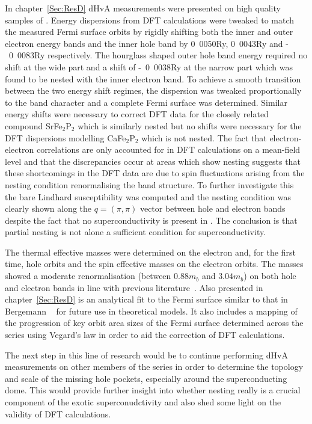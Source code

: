 
In chapter~\ref{Sec:ResD} \ac{dHvA} measurements were presented on high quality samples of \BaFeP. Energy dispersions from \ac{DFT} calculations were tweaked to match the measured Fermi surface orbits by rigidly shifting both the inner and outer electron energy bands and the inner hole band by \unit{0.0050}{\textrm{Ry}}, \unit{0.0043}{\textrm{Ry}} and \unit{-0.0083}{\textrm{Ry}} respectively. The hourglass shaped outer hole band energy required no shift at the wide part and a shift of \unit{-0.0038}{\textrm{Ry}} at the narrow part which was found to be nested with the inner electron band. To achieve a smooth transition between the two energy shift regimes, the dispersion was tweaked proportionally to the \DzTwo{} band character and a complete Fermi surface was determined. Similar energy shifts were necessary to correct \ac{DFT} data for the closely related compound SrFe$_2$P$_2$ which is similarly nested but no shifts were necessary for the \ac{DFT} dispersions modelling CaFe$_2$P$_2$ which is not nested. The fact that electron-electron correlations are only accounted for in \ac{DFT} calculations on a mean-field level and that the discrepancies occur at areas which show nesting suggests that these shortcomings in the \ac{DFT} data are due to spin fluctuations arising from the nesting condition renormalising the band structure. To further investigate this the bare Lindhard susceptibility was computed and the nesting condition was clearly shown along the $q = (\pi, \pi)$ vector between hole and electron bands despite the fact that no superconductivity is present in \BaFeP. The conclusion is that partial nesting is not alone a sufficient condition for superconductivity.

The thermal effective masses were determined on the electron and, for the first time, hole orbits and the spin effective masses on the electron orbits. The masses showed a moderate renormalisation (between $\unit{0.88}{m_b}$ and $\unit{3.04}{m_b}$) on both hole and electron bands in line with previous literature~\cite{Shishido2010}.  Also presented in chapter~\ref{Sec:ResD} is an analytical fit to the Fermi surface similar to that in Bergemann \etal~\cite{Bergemann2000} for future use in theoretical models. It also includes a mapping of the progression of key orbit area sizes of the Fermi surface determined across the \BaFeAsP{} series using Vegard's law in order to aid the correction of \ac{DFT} calculations.

The next step in this line of research would be to continue performing \ac{dHvA} measurements on other members of the \BaFeAsP{} series in order to determine the topology and scale of the missing hole pockets, especially around the superconducting dome. This would provide further insight into whether nesting really is a crucial component of the exotic superconudctivity and also shed some light on the validity of \ac{DFT} calculations.

